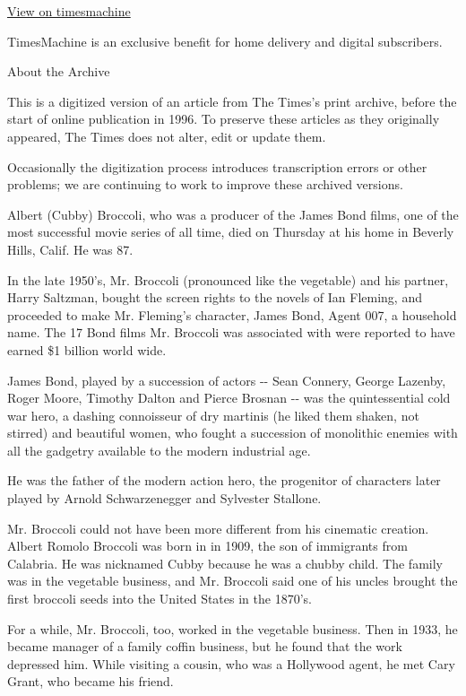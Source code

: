 \href{http://timesmachine.nytimes.com/timesmachine/1996/06/29/049654.html}{View
on timesmachine}

TimesMachine is an exclusive benefit for home delivery and digital
subscribers.

About the Archive

This is a digitized version of an article from The Times's print
archive, before the start of online publication in 1996. To preserve
these articles as they originally appeared, The Times does not alter,
edit or update them.

Occasionally the digitization process introduces transcription errors or
other problems; we are continuing to work to improve these archived
versions.

Albert (Cubby) Broccoli, who was a producer of the James Bond films, one
of the most successful movie series of all time, died on Thursday at his
home in Beverly Hills, Calif. He was 87.

In the late 1950's, Mr. Broccoli (pronounced like the vegetable) and his
partner, Harry Saltzman, bought the screen rights to the novels of Ian
Fleming, and proceeded to make Mr. Fleming's character, James Bond,
Agent 007, a household name. The 17 Bond films Mr. Broccoli was
associated with were reported to have earned \$1 billion world wide.

James Bond, played by a succession of actors -\/- Sean Connery, George
Lazenby, Roger Moore, Timothy Dalton and Pierce Brosnan -\/- was the
quintessential cold war hero, a dashing connoisseur of dry martinis (he
liked them shaken, not stirred) and beautiful women, who fought a
succession of monolithic enemies with all the gadgetry available to the
modern industrial age.

He was the father of the modern action hero, the progenitor of
characters later played by Arnold Schwarzenegger and Sylvester Stallone.

Mr. Broccoli could not have been more different from his cinematic
creation. Albert Romolo Broccoli was born in in 1909, the son of
immigrants from Calabria. He was nicknamed Cubby because he was a chubby
child. The family was in the vegetable business, and Mr. Broccoli said
one of his uncles brought the first broccoli seeds into the United
States in the 1870's.

For a while, Mr. Broccoli, too, worked in the vegetable business. Then
in 1933, he became manager of a family coffin business, but he found
that the work depressed him. While visiting a cousin, who was a
Hollywood agent, he met Cary Grant, who became his friend.

